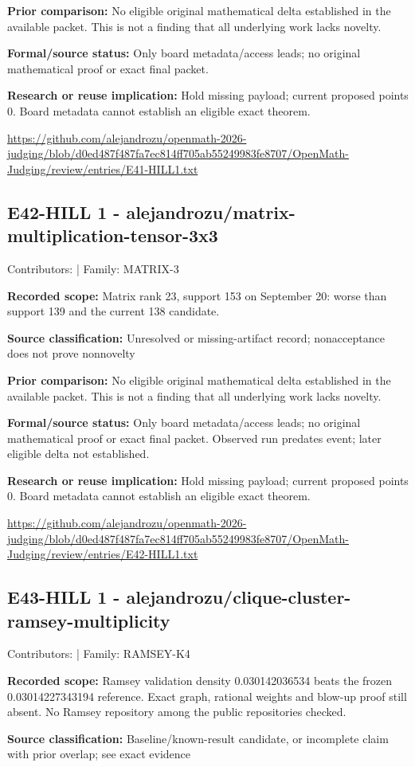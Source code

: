\documentclass[11pt,a4paper]{article}
\begin{document}
\textbf{Prior comparison:} No eligible original mathematical delta established in the available packet. This is not a finding that all underlying work lacks novelty.

\textbf{Formal/source status:} Only board metadata/access leads; no original mathematical proof or exact final packet. 

\textbf{Research or reuse implication:} Hold missing payload; current proposed points 0. Board metadata cannot establish an eligible exact theorem.

{\small \url{https://github.com/alejandrozu/openmath-2026-judging/blob/d0ed487f487fa7ec814ff705ab55249983fe8707/OpenMath-Judging/review/entries/E41-HILL1.txt}\par}

\begin{samepage}
\subsection{E42-HILL 1  -  alejandrozu/matrix-multiplication-tensor-3x3}
{\small Contributors:  | Family: MATRIX-3\par}

\textbf{Recorded scope:} Matrix rank 23, support 153 on September 20: worse than support 139 and the current 138 candidate.

\end{samepage}
\textbf{Source classification:} Unresolved or missing-artifact record; nonacceptance does not prove nonnovelty

\textbf{Prior comparison:} No eligible original mathematical delta established in the available packet. This is not a finding that all underlying work lacks novelty.

\textbf{Formal/source status:} Only board metadata/access leads; no original mathematical proof or exact final packet. Observed run predates event; later eligible delta not established.

\textbf{Research or reuse implication:} Hold missing payload; current proposed points 0. Board metadata cannot establish an eligible exact theorem.

{\small \url{https://github.com/alejandrozu/openmath-2026-judging/blob/d0ed487f487fa7ec814ff705ab55249983fe8707/OpenMath-Judging/review/entries/E42-HILL1.txt}\par}

\begin{samepage}
\subsection{E43-HILL 1  -  alejandrozu/clique-cluster-ramsey-multiplicity}
{\small Contributors:  | Family: RAMSEY-K4\par}

\textbf{Recorded scope:} Ramsey validation density 0.030142036534 beats the frozen 0.03014227343194 reference. Exact graph, rational weights and blow-up proof still absent. No Ramsey repository among the public repositories checked.

\end{samepage}
\textbf{Source classification:} Baseline/known-result candidate, or incomplete claim with prior overlap; see exact evidence
\end{document}
